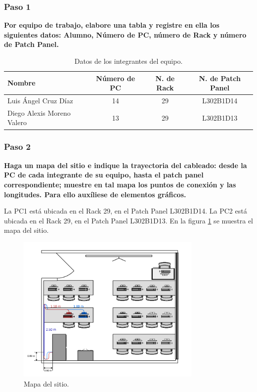         \subsubsection*{Paso 1}
        \textbf{Por equipo de trabajo, elabore una tabla y registre en ella los siguientes datos: Alumno, Número
        de PC, número de Rack y número de Patch Panel.}

        \begin{table}[H]
            \begin{center}
                \begin{tabular}{ l | c | c | c }
                    \textbf{Nombre} & \textbf{Número de PC} & \textbf{N. de Rack} & \textbf{N. de Patch Panel}\\ \hline
                    Luis Ángel Cruz Díaz & 14 & 29 & L302B1D14\\
                    Diego Alexis Moreno Valero & 13 & 29 & L302B1D13
                \end{tabular}
                \caption{Datos de los integrantes del equipo.}
                \label{tab:Datos_Equipo}
                \end{center}
        \end{table}

        \subsubsection*{Paso 2}
        \textbf{Haga un mapa del sitio e indique la trayectoria del cableado: desde la PC de cada integrante de su equipo, hasta el patch panel correspondiente; muestre en tal mapa los puntos de conexión y las longitudes. Para ello auxíliese de elementos gráficos.}

        La PC1 está ubicada en el Rack 29, en el Patch Panel L302B1D14. La PC2 está ubicada en el Rack 29, en el Patch Panel L302B1D13. En la figura \ref{fig:mapa_sitio} se muestra el mapa del sitio.

        \begin{figure}[H]
            \centering
            \includegraphics[width=0.8\textwidth]{img/planos.png}
            \caption{Mapa del sitio.}
            \label{fig:mapa_sitio}
        \end{figure}

